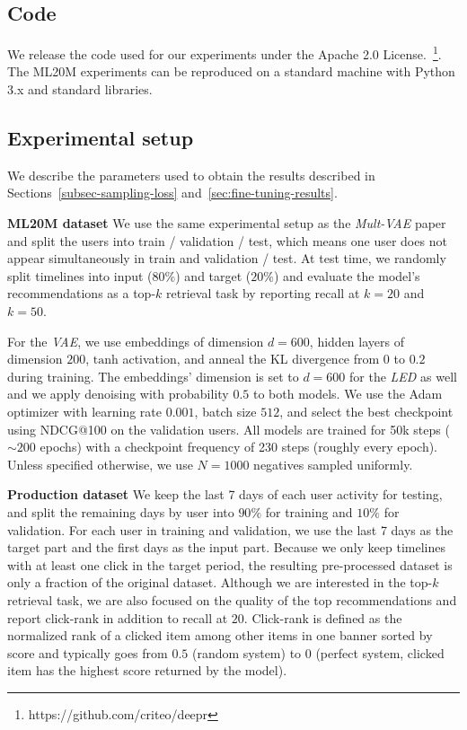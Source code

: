 \documentclass[sigconf]{acmart}
\begin{document}
\subsection{Code}
We release the code used for our experiments under the Apache 2.0 License.~\footnote{https://github.com/criteo/deepr}. The ML20M experiments can be reproduced on a standard machine with Python 3.x and standard libraries.

\subsection{Experimental setup}
\label{subsec:exp-setup}

We describe the parameters used to obtain the results described in Sections~\ref{subsec-sampling-loss} and~\ref{sec:fine-tuning-results}.

\textbf{ML20M dataset} We use the same experimental setup as the \emph{Mult-VAE} paper~\cite{variational-liang-2018} and split the users into train / validation / test, which means one user does not appear simultaneously in train and validation / test. At test time, we randomly split timelines into input ($ 80\% $) and target ($ 20\% $) and evaluate the model's recommendations as a top-$k$ retrieval task by reporting recall at $ k=20 $ and $ k=50 $. 

For the \emph{VAE}, we use embeddings of dimension $ d = 600 $, hidden layers of dimension $ 200 $, $ \text{tanh} $ activation, and anneal the KL divergence from $ 0 $ to $ 0.2 $ during training. The embeddings' dimension is set to $ d = 600 $ for the \emph{LED} as well and we apply denoising with probability $ 0.5 $ to both models. We use the Adam~\cite{adam-iclr-2015} optimizer with learning rate $ 0.001 $, batch size $ 512 $, and select the best checkpoint using NDCG@100 on the validation users. All models are trained for 50k steps ($ \sim 200 $  epochs) with a checkpoint frequency of 230 steps (roughly every epoch). Unless specified otherwise, we use $ N = 1000 $ negatives sampled uniformly.

\textbf{Production dataset} We keep the last 7 days of each user activity for testing, and split the remaining days by user into $90\%$ for training and $10\%$ for validation. For each user in training and validation, we use the last 7 days as the target part and the first days as the input part. Because we only keep timelines with at least one click in the target period, the resulting pre-processed dataset is only a fraction of the original dataset. Although we are interested in the top-$k$ retrieval task, we are also focused on the quality of the top recommendations and report click-rank in addition to recall at $20$. Click-rank is defined as the normalized rank of a clicked item among other items in one banner sorted by score and typically goes from $ 0.5 $ (random system) to $ 0 $ (perfect system, clicked item has the highest score returned by the model).
\end{document}
